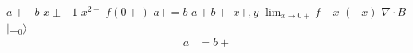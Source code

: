 \documentclass{article}
\begin{document}
$a+-b$ $x\pm-1$ $x^{2+}$ $f(0+)$ $a+ =b$ $a+b+$ $x+,y$ $\lim_{x\to0+}f$ $-x$ $(-x)$
$\nabla\cdot B$ $|\bot_0\rangle$
\begin{align}
a&=b+
\end{align}
\end{document}

